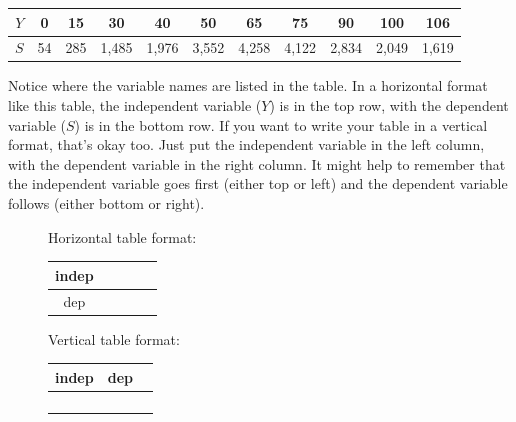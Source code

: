 \begin{center}
\begin{tabular} {|c| |c|c|c|c|c|c|c|c|c|c|} \hline
$Y$ & 0 & 15 & 30 & 40 & 50 & 65 & 75 & 90 & 100 & 106 \\ \hline
$S$ & 54 & 285 & 1,485& 1,976 & 3,552 &  4,258 &  4,122 &  2,834 &  2,049 &  1,619 \\ \hline
\end{tabular}
\end{center}

Notice where the variable names are listed in the table. In a horizontal format like this table, the independent variable ($Y$) is in the top row, with the dependent variable ($S$) is in the bottom row.  If you want to write your table in a vertical format, that's okay too.  Just put the independent variable in the left column, with the dependent variable in the right column. It might help to remember that the independent variable goes first (either top or left) and the dependent variable follows (either bottom or right).  

 \begin{center}
 \begin{figure} [h]
\begin{minipage}{3.5in} 
Horizontal table format:

\bigskip

\begin{tabular} {|c| |c|c|c|c|} \hline
indep & \hspace{.5in} & \hspace{.5in} & \hspace{.5in} &\hspace{.5in}  \\ \hline
dep & & & & \\ \hline
\end{tabular}
\vspace{.6in}  %
\end{minipage} 
\begin{minipage}{2.5 in} 
Vertical table format:

\bigskip

\begin{tabular} {|c| c|} \hline
\hspace{.05in}  indep \hspace{.05in} & \hspace{.1in} dep\hspace{.1in} ~  \\ \hline \hline
&  \\ \hline
& \\ \hline
& \\ \hline
& \\ \hline
\end{tabular}
\end{minipage} 
\end{figure}
\end{center}
\vspace{-.3in}  %

